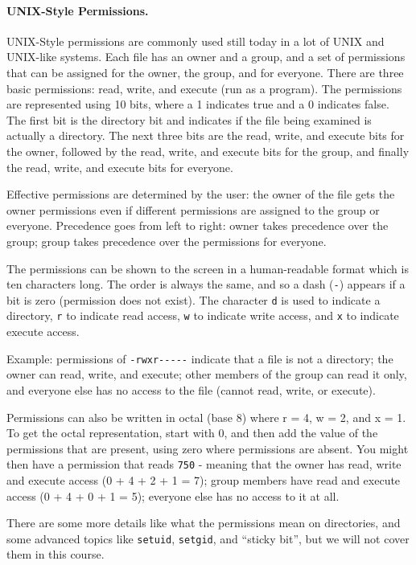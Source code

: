 \paragraph{UNIX-Style Permissions.}
UNIX-Style permissions are commonly used still today in a lot of UNIX and UNIX-like systems. Each file has an owner and a group, and a set of permissions that can be assigned for the owner, the group, and for everyone. There are three basic permissions: read, write, and execute (run as a program). The permissions are represented using 10 bits, where a 1 indicates true and a 0 indicates false. The first bit is the directory bit and indicates if the file being examined is actually a directory. The next three bits are the read, write, and execute bits for the owner, followed by the read, write, and execute bits for the group, and finally the read, write, and execute bits for everyone.

Effective permissions are determined by the user: the owner of the file gets the owner permissions even if different permissions are assigned to the group or everyone. Precedence goes from left to right: owner takes precedence over the group; group takes precedence over the permissions for everyone.

The permissions can be shown to the screen in a human-readable format which is ten characters long. The order is always the same, and so a dash (\texttt{-}) appears if a bit is zero (permission does not exist). The character \texttt{d} is used to indicate a directory, \texttt{r} to indicate read access, \texttt{w} to indicate write access, and \texttt{x} to indicate execute access.

Example: permissions of \texttt{-rwxr{-}{-}{-}{-}{-}} indicate that a file is not a directory; the owner can read, write, and execute; other members of the group can read it only, and everyone else has no access to the file (cannot read, write, or execute). 

Permissions can also be written in octal (base 8) where r = 4, w = 2, and x = 1. To get the octal representation, start with 0, and then add the value of the  permissions that are present, using zero where permissions are absent. You might then have a permission that reads \texttt{750} - meaning that the owner has read, write and execute access (0 + 4 + 2 + 1 = 7); group members have read and execute access (0 + 4 + 0 + 1 = 5); everyone else has no access to it at all.

There are some more details like what the permissions mean on directories, and some advanced topics like \texttt{setuid}, \texttt{setgid}, and ``sticky bit'', but we will not cover them in this course.

